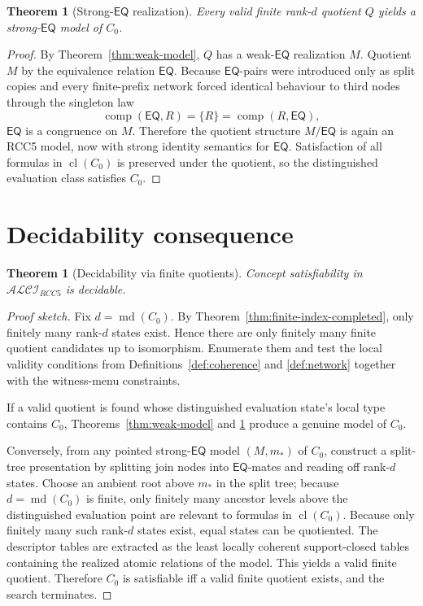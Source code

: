 \documentclass[11pt]{article}
\newtheorem{theorem}[definition]{Theorem}
\theoremstyle{remark}
\newcommand{\EQ}{\mathsf{EQ}}
\newcommand{\cl}{\operatorname{cl}}
\newcommand{\comp}{\operatorname{comp}}
\newcommand{\md}{\operatorname{md}}
\begin{document}
\begin{theorem}[Strong-$\EQ$ realization]\label{thm:strong-model}
Every valid finite rank-$d$ quotient $Q$ yields a strong-$\EQ$ model of $C_0$.
\end{theorem}

\begin{proof}
By Theorem~\ref{thm:weak-model}, $Q$ has a weak-$\EQ$ realization $M$. Quotient $M$ by the equivalence relation $\EQ$. Because $\EQ$-pairs were introduced only as split copies and every finite-prefix network forced identical behaviour to third nodes through the singleton law
\[
\comp(\EQ,R)=\{R\}=\comp(R,\EQ),
\]
$\EQ$ is a congruence on $M$. Therefore the quotient structure $M/{\EQ}$ is again an RCC5 model, now with strong identity semantics for $\EQ$. Satisfaction of all formulas in $\cl(C_0)$ is preserved under the quotient, so the distinguished evaluation class satisfies $C_0$.
\end{proof}

\section{Decidability consequence}

\begin{theorem}[Decidability via finite quotients]\label{thm:decidability}
Concept satisfiability in $\mathcal{ALCI}_{RCC5}$ is decidable.
\end{theorem}

\begin{proof}[Proof sketch]
Fix $d=\md(C_0)$. By Theorem~\ref{thm:finite-index-completed}, only finitely many rank-$d$ states exist. Hence there are only finitely many finite quotient candidates up to isomorphism. Enumerate them and test the local validity conditions from Definitions~\ref{def:coherence} and \ref{def:network} together with the witness-menu constraints.

If a valid quotient is found whose distinguished evaluation state's local type contains $C_0$, Theorems~\ref{thm:weak-model} and \ref{thm:strong-model} produce a genuine model of $C_0$.

Conversely, from any pointed strong-$\EQ$ model $(M,m_{\ast})$ of $C_0$, construct a split-tree presentation by splitting join nodes into $\EQ$-mates and reading off rank-$d$ states. Choose an ambient root above $m_{\ast}$ in the split tree; because $d=\md(C_0)$ is finite, only finitely many ancestor levels above the distinguished evaluation point are relevant to formulas in $\cl(C_0)$. Because only finitely many such rank-$d$ states exist, equal states can be quotiented. The descriptor tables are extracted as the least locally coherent support-closed tables containing the realized atomic relations of the model. This yields a valid finite quotient. Therefore $C_0$ is satisfiable iff a valid finite quotient exists, and the search terminates.
\end{proof}
\end{document}
